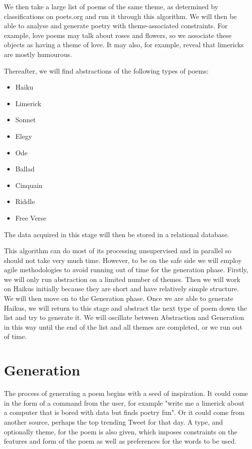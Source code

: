 We then take a large list of poems of the same theme, as determined by classifications on poets.org and run it through this algorithm. We will then be able to analyse and generate poetry with theme-associated constraints. For example, love poems may talk about roses and flowers, so we associate these objects as having a theme of love. It may also, for example, reveal that limericks are mostly humourous.

Thereafter, we will find abstractions of the following types of poems:
\begin{itemize}
\setlength{\itemsep}{0pt}
\item{Haiku}
\item{Limerick}
\item{Sonnet}
\item{Elegy}
\item{Ode}
\item{Ballad}
\item{Cinquain}
\item{Riddle}
\item{Free Verse}
\end{itemize}

The data acquired in this stage will then be stored in a relational database.

This algorithm can do most of its processing unsupervised and in parallel so should not take very much time. However, to be on the safe side we will employ agile methodologies to avoid running out of time for the generation phase. Firstly, we will only run abstraction on a limited number of themes. Then we will work on Haikus initially because they are short and have relatively simple structure. We will then move on to the Generation phase. Once we are able to generate Haikus, we will return to this stage and abstract the next type of poem down the list and try to generate it. We will oscillate between Abstraction and Generation in this way until the end of the list and all themes are completed, or we run out of time.

\section{Generation}

The process of generating a poem begins with a seed of inspiration. It could come in the form of a command from the user, for example "write me a limerick about a computer that is bored with data but finds poetry fun". Or it could come from another source, perhaps the top trending Tweet for that day. A type, and optionally theme, for the poem is also given, which imposes constraints on the features and form of the poem as well as preferences for the words to be used.

